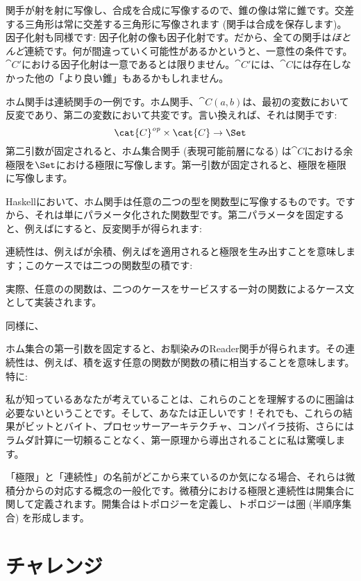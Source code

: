 \noindent
関手が射を射に写像し、合成を合成に写像するので、錐の像は常に錐です。交差する三角形は常に交差する三角形に写像されます (関手は合成を保存します)。因子化射も同様です: 因子化射の像も因子化射です。だから、全ての関手は\emph{ほとんど}連続です。何が間違っていく可能性があるかというと、一意性の条件です。$\cat{C'}$における因子化射は一意であるとは限りません。$\cat{C'}$には、$\cat{C}$には存在しなかった他の「より良い錐」もあるかもしれません。

ホム関手は連続関手の一例です。ホム関手、$\cat{C}(a, b)$は、最初の変数において反変であり、第二の変数において共変です。言い換えれば、それは関手です: 
\[\cat{C}^\mathit{op} \times \cat{C} \to \Set\]
第二引数が固定されると、ホム集合関手 (表現可能前層になる) は$\cat{C}$における余極限を$\Set$における極限に写像します。第一引数が固定されると、極限を極限に写像します。

Haskellにおいて、ホム関手は任意の二つの型を関数型に写像するものです。ですから、それは単にパラメータ化された関数型です。第二パラメータを固定すると、例えばにすると、反変関手が得られます: 

連続性は、例えばが余積、例えばを適用されると極限を生み出すことを意味します；このケースでは二つの関数型の積です: 

実際、任意のの関数は、二つのケースをサービスする一対の関数によるケース文として実装されます。

同様に、

ホム集合の第一引数を固定すると、お馴染みのReader関手が得られます。その連続性は、例えば、積を返す任意の関数が関数の積に相当することを意味します。特に: 

私が知っているあなたが考えていることは、これらのことを理解するのに圏論は必要ないということです。そして、あなたは正しいです！それでも、これらの結果がビットとバイト、プロセッサーアーキテクチャ、コンパイラ技術、さらにはラムダ計算に一切頼ることなく、第一原理から導出されることに私は驚嘆します。

「極限」と「連続性」の名前がどこから来ているのか気になる場合、それらは微積分からの対応する概念の一般化です。微積分における極限と連続性は開集合に関して定義されます。開集合はトポロジーを定義し、トポロジーは圏 (半順序集合) を形成します。

\section{チャレンジ}

